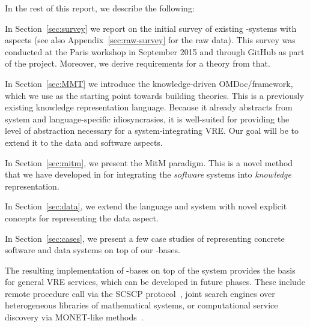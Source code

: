 In the rest of this report, we describe the following:
\begin{compactenum}
\item In Section~\ref{sec:survey} we report on the initial survey of existing \pn-systems with
\DKS aspects (see also Appendix~\ref{sec:raw-survey} for the raw data).
This survey was conducted at the Paris workshop in September 2015 and through GitHub as part of the \pn project.
Moreover, we derive requirements for a \DKS theory from that.
\item In Section~\ref{sec:MMT} we introduce the knowledge-driven OMDoc/\MMT framework, which we use as the
  starting point towards building \DKS theories.
  This is a previously existing knowledge representation language.
  Because it already abstracts from system and language-specific idiosyncrasies, it is well-suited for providing the level of abstraction necessary for a system-integrating VRE.
  Our goal will be to extend it to the data and software aspects.
\item In Section~\ref{sec:mitm}, we present the MitM paradigm.
  This is a novel method that we have developed in \pn for integrating the \emph{software} systems into \emph{knowledge} representation.
\item In Section~\ref{sec:data}, we extend the \MMT language and system with novel explicit concepts for representing the data aspect.
\item In Section~\ref{sec:cases}, we present a few case studies of representing concrete software and data systems on top of our \DKS-bases.
\end{compactenum}

The resulting implementation of \DKS-bases on top of the \MMT system provides the basis for general VRE services, which can be developed in future \pn phases.
These include remote procedure call via the SCSCP protocol~\cite{SCSCP,FHKLR:SCSCP08,HorRoz:ossp09}, joint search engines over heterogeneous libraries of mathematical systems, or computational service discovery via MONET-like methods~\cite{aird-et-al:2005}.



